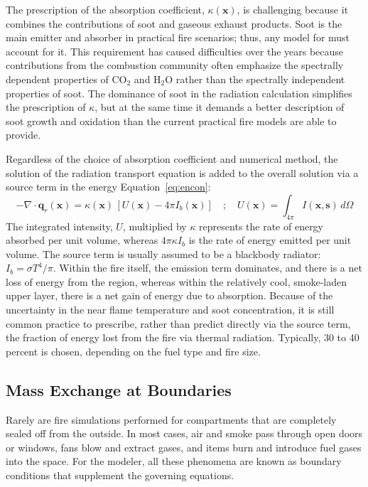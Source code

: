 \documentclass[graybox]{svmult}
\begin{document}
The prescription of the absorption coefficient, $\kappa(\mathbf{x})$, is challenging because it combines the contributions of soot and gaseous exhaust products. Soot is the main emitter and absorber in practical fire scenarios; thus, any model for must account for it. This requirement has caused difficulties over the years because contributions from the combustion community often  emphasize the spectrally dependent properties of CO$_2$ and H$_2$O rather than the spectrally independent properties of soot. The dominance of soot in the  radiation calculation simplifies the prescription of $\kappa$, but at the same time it demands a better description of soot growth and oxidation than the current practical fire models are able to provide.

Regardless of the choice of absorption coefficient and numerical method, the solution of the radiation transport equation is added to the overall solution via a source term in the energy Equation~\ref{eq:encon}:
\begin{equation}
-\nabla \cdot \mathbf{q}_r(\mathbf{x}) = \kappa(\mathbf{x}) \, \left[ U(\mathbf{x}) - 4 \pi I_b(\mathbf{x}) \right] \quad ; \quad U(\mathbf{x}) = \int_{4\pi} I(\mathbf{x},\mathbf{s}) \, d\Omega
\label{eq:radterm}
\end{equation}
The integrated intensity, $U$, multiplied by $\kappa$ represents the rate of energy absorbed per unit volume, whereas $4 \pi \kappa I_b$ is the rate of energy emitted per unit volume. The source term is usually assumed to be a blackbody radiator: $I_b=\sigma T^4/\pi$. Within the fire itself, the emission term dominates, and there is a net loss of energy from the region, whereas within the relatively cool, smoke-laden upper layer, there is a net gain of energy due to absorption. Because of the uncertainty in the near flame temperature and soot concentration, it is still common practice to prescribe, rather than predict directly via the source term, the fraction of energy lost from the fire via thermal radiation. Typically, 30 to 40 percent is chosen, depending on the fuel type and fire size.


\subsection{Mass Exchange at Boundaries}

Rarely are fire simulations performed for compartments that are completely sealed off from the outside. In most cases, air and smoke pass through open doors or windows, fans blow and extract gases, and items burn and introduce fuel gases into the space. For the modeler, all these phenomena are known as boundary conditions that supplement the governing equations.
\end{document}
